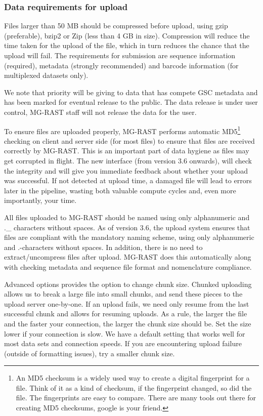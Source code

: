 \documentclass[12pt,fullpage]{report}
\begin{document}
\subsubsection*{Data requirements for upload}

Files larger than 50 MB should be compressed before upload, using gzip (preferable), bzip2 or Zip (less than 4 GB in size). Compression will reduce the time taken for the upload of the file, which in turn reduces the chance that the upload will fail. The requirements for submission are sequence information (required), metadata (strongly recommended) and barcode information (for multiplexed datasets only).

We note that priority will be giving to data that has compete GSC metadata and has been marked for eventual release to the public. The data release is under user control, MG-RAST staff will not release the data for the user.

To ensure files are uploaded properly, MG-RAST performs automatic MD5\footnote{An MD5 checksum is a widely used way to create a digital fingerprint for a file. Think of it as a kind of checksum, if the fingerprint changed, so did the file. The fingerprints are easy to compare. There are many tools out there for creating MD5 checksums, google is your friend.} checking on client and server side (for most files) to ensure that files are received correctly by MG-RAST.  This is an important part of data hygiene as files may get corrupted in flight. The new interface (from version 3.6 onwards), will check the integrity and will give you immediate feedback about whether your upload was successful.  If not detected at upload time, a damaged file will lead to errors later in the pipeline, wasting both valuable compute cycles and, even more importantly, your time.

All files uploaded to MG-RAST should be named using only alphanumeric and .\_ characters without spaces. As of version 3.6, the upload system ensures that files are compliant with the mandatory naming scheme,  using only alphanumeric and .-characters without spaces. In addition, there is no need to extract/uncompress files after upload. MG-RAST does this automatically along with checking metadata and sequence file format and nomenclature compliance.

Advanced options provides the option to change chunk size. Chunked uploading allows us to break a large file into small chunks, and send these pieces to the upload server one-by-one. If an upload fails, we need only resume from the last successful chunk and allows for resuming uploads. As a rule, the larger the file and the faster your connection, the larger the chunk size should be. Set the size lower if your connection is slow. We have a default setting that works well for most data sets and connection speeds. If you are encountering upload failure (outside of formatting issues), try a smaller chunk size.
\end{document}
